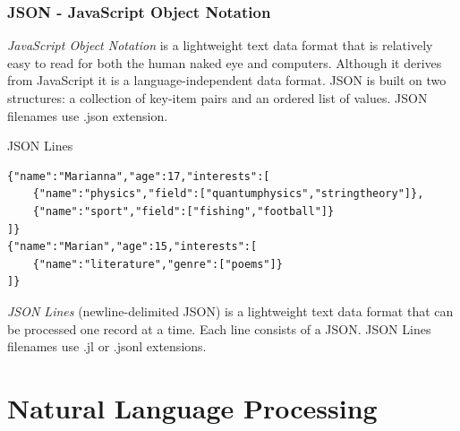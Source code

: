 \documentclass[aspectratio=169]{beamer}
\begin{document}
\begin{frame}
    \frametitle{JSON - JavaScript Object Notation}
    \begin{definition}
        \emph{JavaScript Object Notation} is a lightweight text data format that is relatively easy to read for both the human naked eye and computers. Although it derives from JavaScript it is a language-independent data format. JSON is built on two structures: a collection of key-item pairs and an ordered list of values. JSON filenames use .json extension.
    \end{definition}
\end{frame}


\begin{frame}[fragile]{JSON Lines}
\begin{verbatim}
{"name":"Marianna","age":17,"interests":[
    {"name":"physics","field":["quantumphysics","stringtheory"]},
    {"name":"sport","field":["fishing","football"]}
]}
{"name":"Marian","age":15,"interests":[
    {"name":"literature","genre":["poems"]}
]}
\end{verbatim}
\begin{definition}
    \emph{JSON Lines} (newline-delimited JSON) is a lightweight text data format that can be processed one record at a time. Each line consists of a JSON. JSON Lines filenames use .jl or .jsonl extensions.
\end{definition}
\end{frame}

\section[NLP]{Natural Language Processing}
\end{document}
